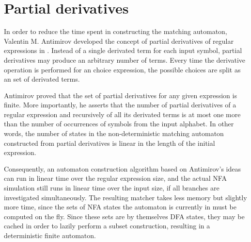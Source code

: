 \section{Partial derivatives}

In order to reduce the time spent in constructing the matching automaton,
Valentin M. Antimirov developed the concept of partial derivatives of regular
expressions in \cite{antimirov}. Instead of a single derivated term for each
input symbol, partial derivatives may produce an arbitrary number of terms.
Every time the derivative operation is performed for an choice expression, the
possible choices are split as an set of derivated terms.

Antimirov proved that the set of partial derivatives for any given expression is
finite. More importantly, he asserts that the number of partial derivatives of a
regular expression and recursively of all its derivated terms is at most one
more than the number of occurrences of symbols from the input alphabet. In other
words, the number of states in the non-deterministic matching automaton
constructed from partial derivatives is linear in the length of the initial
expression.

Consequently, an automaton construction algorithm based on Antimirov's ideas can
run in linear time over the regular expression size, and the actual NFA
simulation still runs in linear time over the input size, if all branches are
investigated simultaneously. The resulting matcher takes less memory but
slightly more time, since the sets of NFA states the automaton is currently in
must be computed on the fly. Since these sets are by themselves DFA states, they
may be cached in order to lazily perform a subset construction, resulting in a
deterministic finite automaton.


